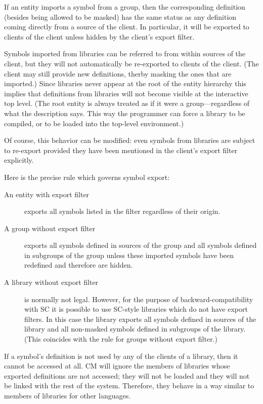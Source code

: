 \documentclass{article}
\begin{document}
If an entity imports a symbol from a group, then the corresponding
definition (besides being allowed to be masked) has the same status
as any definition coming directly from a source of the client.  In
particular, it will be exported to clients of the client unless hidden
by the client's export filter.

Symbols imported from libraries can be referred to from within sources
of the client, but they will not automatically be re-exported to
clients of the client.  (The client may still provide new definitions,
therby masking the ones that are imported.)  Since libraries never
appear at the root of the entity hierarchy this implies that
definitions from libraries will not become visible at the interactive
top level.  (The root entity is always treated as if it were a
group---regardless of what the description says.  This way the
programmer can force a library to be compiled, or to be loaded into
the top-level environment.)

Of course, this behavior can be modified: even symbols from libraries
are subject to re-export provided they have been mentioned in the
client's export filter explicitly.

Here is the precise rule which governs symbol export:

\begin{description}
\item[An entity with export filter] exports all symbols listed in the
filter regardless of their origin.
\item[A group without export filter] exports all symbols defined in
sources of the group and all symbols defined in subgroups of the group
unless these imported symbols have been redefined and therefore are
hidden.
\item[A library without export filter] is normally not legal.
However, for the purpose of backward-compatibility with SC it is
possible to use SC-style libraries which do not have export
filters.  In this case the library exports all symbols defined in
sources of the library and all non-masked symbols defined in
subgroups of the library. (This coincides with the rule for
groups without export filter.)
\end{description}

If a symbol's definition is not used by any of the clients of a
library, then it cannot be accessed at all.  CM will ignore the
members of libraries whose exported definitions are not accessed; they
will not be loaded and they will not be linked with the rest of the
system.  Therefore, they behave in a way similar to members of
libraries for other languages.
\end{document}
